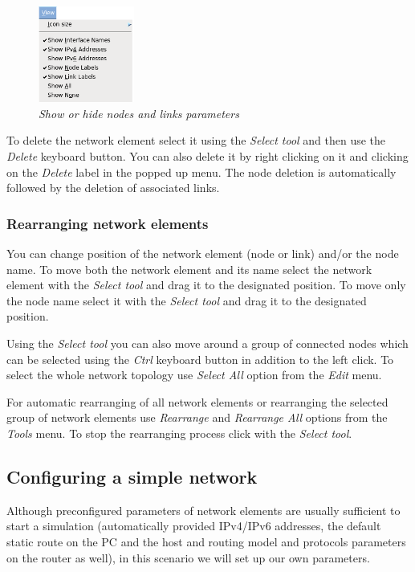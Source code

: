 \begin{figure}[H]
\centering
\vspace{10pt}
\includegraphics[width=0.28\textwidth]{./images/view_menu1.png}
\caption{\emph{Show or hide nodes and links parameters}}
\label{fig:view_menu1}
\end{figure}

To delete the network element select it using the \emph{Select tool} and then
use the \emph{Delete} keyboard button. You can also delete it by right clicking
on it and clicking on the \emph{Delete} label in the popped up menu. The node
deletion is automatically followed by the deletion of associated links.

\subsubsection{Rearranging network elements}
You can change position of the network element (node or link) and/or the node
name. To move both the network element and its name select the network element
with the \emph{Select tool} and drag it to the designated position. To move
only the node name select it with the \emph{Select tool} and drag it to the
designated position.

Using the \emph{Select tool} you can also move around a group of connected
nodes which can be selected using the \emph{Ctrl} keyboard button in addition
to the left click. To select the whole network topology use \emph{Select All}
option from the \emph{Edit} menu.

For automatic rearranging of all network elements or rearranging the selected
group of network elements use \emph{Rearrange} and \emph{Rearrange All} options
from the \emph{Tools} menu. To stop the rearranging process click with the
\emph{Select tool}.

\subsection{Configuring a simple network}

Although preconfigured parameters of network elements are usually sufficient to
start a simulation (automatically provided IPv4/IPv6 addresses, the default
static route on the PC and the host and routing model and protocols parameters
on the router as well), in this scenario we will set up our own parameters.

